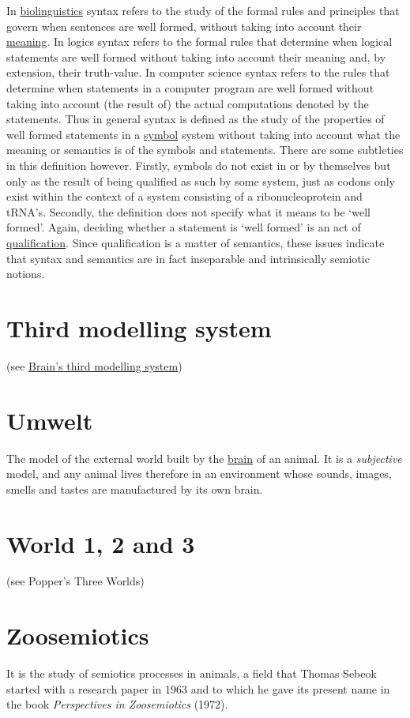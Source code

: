 \documentclass[12pt]{article}
\begin{document}
In \hyperlink{biolinguistics}{biolinguistics} syntax refers to the
study of the formal rules and principles that govern when sentences
are well formed, without taking into account their \hyperlink{meaning}{meaning}. In logics
syntax refers to the formal rules that determine when logical
statements are well formed without taking into account their meaning
and, by extension, their truth-value.  In computer science syntax
refers to the rules that determine when statements in a computer
program are well formed without taking into account (the result of)
the actual computations denoted by the statements. Thus in general
syntax is defined as the study of the properties of well formed
statements in a \hyperlink{icons_indexes_and_symbols}{symbol} system without taking into account what the
meaning or semantics is of the symbols and statements.  There are some
subtleties in this definition however. Firstly, symbols do not exist
in or by themselves but only as the result of being qualified as such
by some system, just as codons only exist within the context of a
system consisting of a ribonucleoprotein and tRNA's. Secondly, the
definition does not specify what it means to be `well formed'. Again,
deciding whether a statement is `well formed' is an act of
\hyperlink{qualification}{qualification}. Since qualification is a
matter of semantics, these issues indicate that syntax and semantics
are in fact inseparable and intrinsically semiotic notions.

\hypertarget{third_modelling_system}{}
\section{Third modelling system} (see \hyperlink{brains_third_modelling_system}{Brain's third modelling system})


\hypertarget{umwelt}{}
\section{Umwelt}
The model of the external world built by the \hyperlink{brain}{brain} of an animal. It is a \textit{subjective} model, and any animal lives therefore in an environment whose sounds, images, smells and tastes are manufactured by its own brain.


\hypertarget{world_1_2_and_3}{}
\section{World 1, 2 and 3} (see Popper's Three Worlds)


\hypertarget{zoosemiotics}{}
\section{Zoosemiotics}
It is the study of semiotics processes in animals, a field that Thomas Sebeok started with a research paper in 1963 and to which he gave its present name in the book \textit{Perspectives in Zoosemiotics} (1972). 
 



\end{document}
